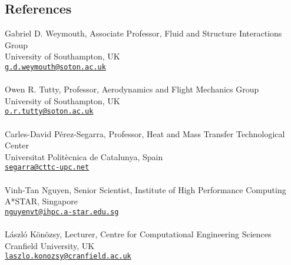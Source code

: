 \documentclass[line]{res}
\newenvironment{p1}
  {\begin{adjustwidth}{-16pt}{0pt}
  \vspace{1pt}}
  {\end{adjustwidth}}
\begin{document}
\begin{resume}
\section{ References}
\begin{p1}
Gabriel D. Weymouth, Associate Professor, Fluid and Structure Interactions Group\\ 
University of Southampton, UK\\
\href{mailto:g.d.weymouth@soton.ac.uk}{\texttt{g.d.weymouth@soton.ac.uk}}\\
\\
Owen R. Tutty, Professor, Aerodynamics and Flight Mechanics Group\\
University of Southampton, UK\\
\href{mailto:o.r.tutty@soton.ac.uk}{\texttt{o.r.tutty@soton.ac.uk}} \\
\\
Carles-David P\'{e}rez-Segarra, Professor, Heat and Mass Transfer Technological Center\\
Universitat Polit\`{e}cnica de Catalunya, Spain\\
\href{mailto:segarra@cttc-upc.net}{\texttt{segarra@cttc-upc.net}}\\
\\
Vinh-Tan Nguyen, Senior Scientist, Institute of High Performance Computing\\
A*STAR, Singapore \\
\href{mailto:nguyenvt@ihpc.a-star.edu.sg}{\texttt{nguyenvt@ihpc.a-star.edu.sg}}\\
\\
L\'{a}szl\'{o} K\"{o}n\"{o}zsy, Lecturer, Centre for Computational Engineering Sciences\\
Cranfield University, UK\\
\href{mailto:laszlo.konozsy@cranfield.ac.uk}{\texttt{laszlo.konozsy@cranfield.ac.uk}} \\
\end{p1}




\end{resume}
\end{document}
